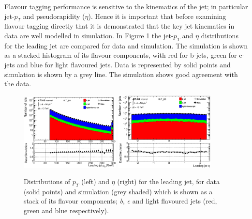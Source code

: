 \documentclass[12pt, onecolumn,notitlepage]{article}
\begin{document}
Flavour tagging performance is sensitive to the kinematics of the jet; in particular jet-$p_{T}$ and pseudorapidity ($\eta$).
Hence it is important that before examining flavour tagging directly that it is demonstrated that the key jet kinematics in data are well modelled
in simulation.
In Figure \ref{LeadJetKine} the jet-$p_T$ and $\eta$ distributions for the leading jet are compared for data and simulation.
The simulation is shown as a stacked histogram of its flavour components, with red for b-jets, green for c-jets and blue for light flavoured jets.
Data is represented by solid points and simulation is shown by a grey line.
The simulation shows good agreement with the data.

\begin{figure}[!htb]
	 \includegraphics[width=0.45\textwidth]{plots/LeadingJet/jetPt.eps}
	 \includegraphics[width=0.45\textwidth]{plots/LeadingJet/eta.eps}
	 \caption{Distributions of $p_{T}$ (left) and $\eta$ (right)
           for the leading jet, for data (solid points) and simulation (grey shaded) 
           which is shown as a stack of its flavour components; \textit{b}, \textit{c} and light flavoured jets (red, green and blue respectively).}
         \label{LeadJetKine}
  \vspace{-0.2cm}
\end{figure}
\end{document}
